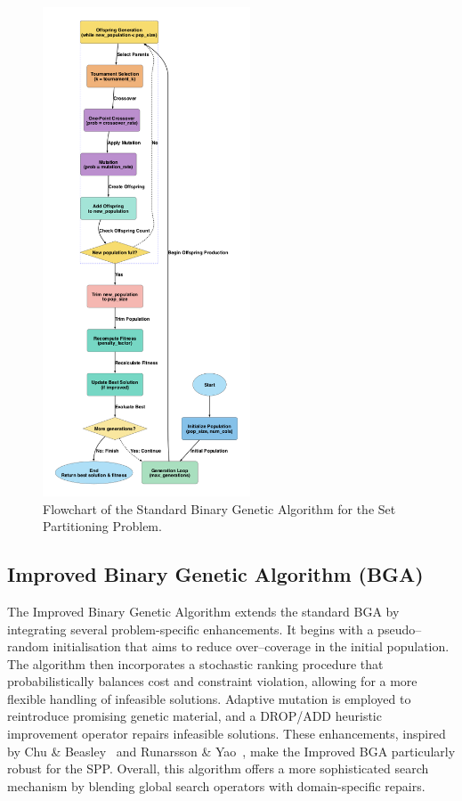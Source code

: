 \documentclass[12pt]{article}
\begin{document}
\begin{figure}[htbp]
  \centering
  \includegraphics[width=0.55\textwidth]{standard_bga_flowchart.png}
  \caption{Flowchart of the Standard Binary Genetic Algorithm for the Set Partitioning Problem.}
  \label{fig:flowchart2}
\end{figure}

\newpage

\subsection{Improved Binary Genetic Algorithm (BGA)}
The Improved Binary Genetic Algorithm extends the standard BGA by integrating several problem-specific enhancements. It begins with a pseudo–random initialisation that aims to reduce over–coverage in the initial population. The algorithm then incorporates a stochastic ranking procedure that probabilistically balances cost and constraint violation, allowing for a more flexible handling of infeasible solutions. Adaptive mutation is employed to reintroduce promising genetic material, and a DROP/ADD heuristic improvement operator repairs infeasible solutions. These enhancements, inspired by Chu \& Beasley~\cite{ChuAndBeasley1998} and Runarsson \& Yao~\cite{RunarssonYao2000}, make the Improved BGA particularly robust for the SPP. Overall, this algorithm offers a more sophisticated search mechanism by blending global search operators with domain-specific repairs.
\end{document}
